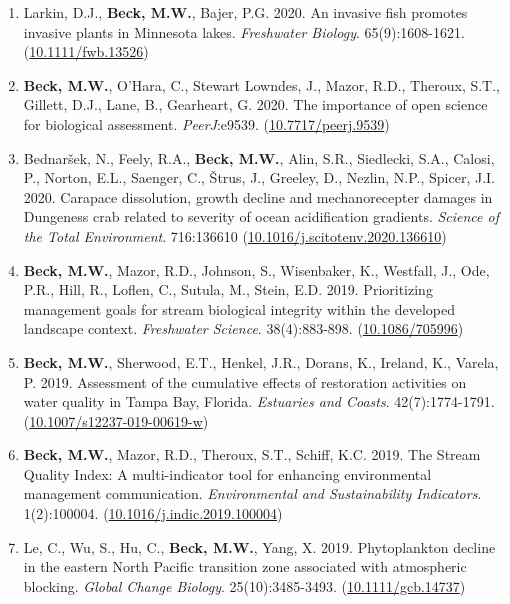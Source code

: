 \documentclass[letterpaper,12pt]{article}
\begin{document}
\begin{enumerate}
\item Larkin, D.J., \textbf{Beck, M.W.}, Bajer, P.G. 2020. An invasive fish promotes invasive plants in Minnesota lakes. \textit{Freshwater Biology}. 65(9):1608-1621. ({\footnotesize\href{https://doi.org/10.1111/fwb.13526}{10.1111/fwb.13526}})

\item \textbf{Beck, M.W.}, O'Hara, C., Stewart Lowndes, J., Mazor, R.D., Theroux, S.T., Gillett, D.J., Lane, B., Gearheart, G. 2020. The importance of open science for biological assessment. \textit{PeerJ}:e9539. ({\footnotesize\href{https://doi.org/10.7717/peerj.9539}{10.7717/peerj.9539}})

\item Bednar\v{s}ek, N., Feely, R.A., \textbf{Beck, M.W.}, Alin, S.R., Siedlecki, S.A., Calosi, P., Norton, E.L., Saenger, C., \v{S}trus, J., Greeley, D., Nezlin, N.P., Spicer, J.I. 2020. Carapace dissolution, growth decline and mechanorecepter damages in {D}ungeness crab related to severity of ocean acidification gradients. \textit{Science of the Total Environment}. 716:136610 ({\footnotesize\href{https://doi.org/10.1016/j.scitotenv.2020.136610}{10.1016/j.scitotenv.2020.136610}})

\item \textbf{Beck, M.W.}, Mazor, R.D., Johnson, S., Wisenbaker, K., Westfall, J., Ode, P.R., Hill, R., Loflen, C., Sutula, M., Stein, E.D. 2019. Prioritizing management goals for stream biological integrity within the developed landscape context. \textit{Freshwater Science}. 38(4):883-898. ({\footnotesize\href{https://doi.org/10.1086/705996}{10.1086/705996}})

\item \textbf{Beck, M.W.}, Sherwood, E.T., Henkel, J.R., Dorans, K., Ireland, K., Varela, P. 2019. Assessment of the cumulative effects of restoration activities on water quality in Tampa Bay, Florida. \textit{Estuaries and Coasts}. 42(7):1774-1791. ({\footnotesize\href{https://doi.org/10.1007/s12237-019-00619-w}{10.1007/s12237-019-00619-w}})

\item \textbf{Beck, M.W.}, Mazor, R.D., Theroux, S.T., Schiff, K.C. 2019. The Stream Quality Index: A multi-indicator tool for enhancing environmental management communication. \textit{Environmental and Sustainability Indicators}. 1(2):100004. ({\footnotesize\href{https://doi.org/10.1016/j.indic.2019.100004}{10.1016/j.indic.2019.100004}})

\item Le, C., Wu, S., Hu, C., \textbf{Beck, M.W.}, Yang, X. 2019. Phytoplankton decline in the eastern {N}orth {P}acific transition zone associated with atmospheric blocking. \textit{Global Change Biology}. 25(10):3485-3493. ({\footnotesize\href{https://doi.org/10.1111/gcb.14737}{10.1111/gcb.14737}})


\end{enumerate}
\end{document}
